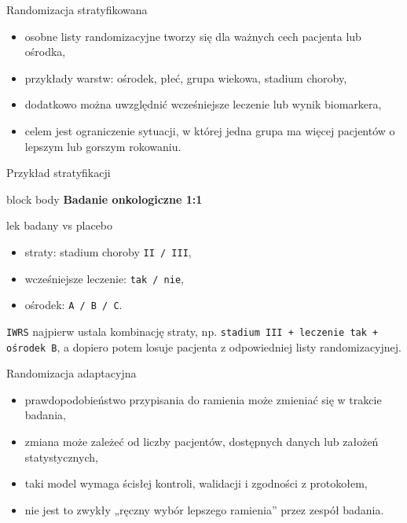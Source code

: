 \begin{frame}{Randomizacja stratyfikowana}
  \begin{itemize}
    \item osobne listy randomizacyjne tworzy się dla ważnych cech pacjenta lub ośrodka,
    \item przykłady warstw: ośrodek, płeć, grupa wiekowa, stadium choroby,
    \item dodatkowo można uwzględnić wcześniejsze leczenie lub wynik biomarkera,
    \item celem jest ograniczenie sytuacji, w której jedna grupa ma więcej pacjentów o lepszym lub gorszym rokowaniu.
  \end{itemize}
\end{frame}

\begin{frame}{Przykład stratyfikacji}
  \small
  \begin{beamercolorbox}[wd=\linewidth,sep=0.8em,rounded=true]{block body}
    \textbf{\textcolor{UAFMDarkBlue}{Badanie onkologiczne 1:1}}\par\medskip
    lek badany vs placebo
  \end{beamercolorbox}

  \vspace{0.25cm}

  \begin{itemize}
    \item straty: stadium choroby \texttt{II / III},
    \item wcześniejsze leczenie: \texttt{tak / nie},
    \item ośrodek: \texttt{A / B / C}.
  \end{itemize}

  \vspace{0.25cm}

  \begin{ExampleBox}
    \texttt{IWRS} najpierw ustala kombinację straty, np. \texttt{stadium III + leczenie tak + ośrodek B}, a dopiero potem losuje pacjenta z odpowiedniej listy randomizacyjnej.
  \end{ExampleBox}
\end{frame}

\begin{frame}{Randomizacja adaptacyjna}
  \begin{itemize}
    \item prawdopodobieństwo przypisania do ramienia może zmieniać się w trakcie badania,
    \item zmiana może zależeć od liczby pacjentów, dostępnych danych lub założeń statystycznych,
    \item taki model wymaga ścisłej kontroli, walidacji i zgodności z protokołem,
    \item nie jest to zwykły „ręczny wybór lepszego ramienia” przez zespół badania.
  \end{itemize}
\end{frame}


